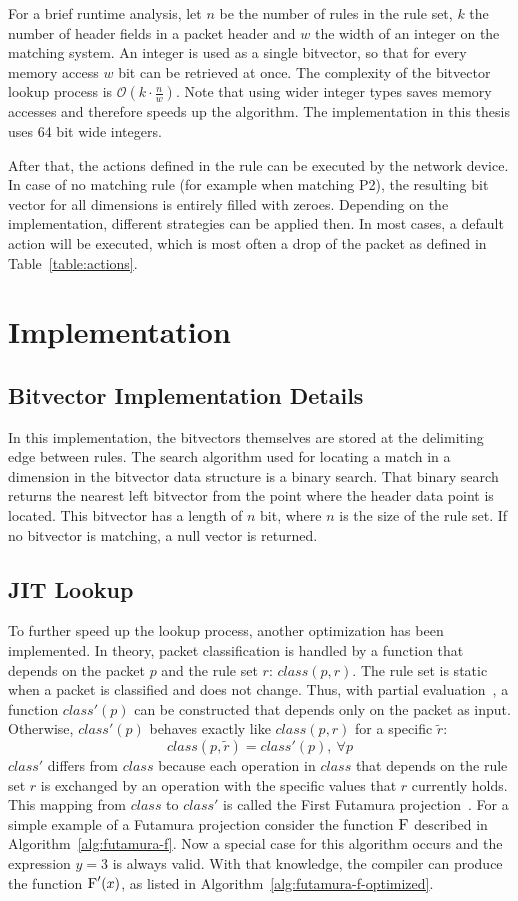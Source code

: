 \documentclass[a4paper,
		12pt,
		parskip=full,
		titlepage
		]{scrartcl}
\begin{document}
For a brief runtime analysis, let $n$ be the number of rules in the rule set, 
$k$ the number of header fields in a packet header and $w$ the width of an integer on the matching system.
An integer is used as a single bitvector, so that for every memory access $w$ bit can be retrieved at once.
The complexity of the bitvector lookup process is $\mathcal O(k \cdot \frac{n}{w})$.
Note that using wider integer types saves memory accesses and therefore speeds up the algorithm.
The implementation in this thesis uses 64 bit wide integers.

After that, the actions defined in the rule can be executed by the network device.
In case of no matching rule (for example when matching P2), the resulting bit vector for all dimensions is entirely filled with zeroes.
Depending on the implementation, different strategies can be applied then.
In most cases, a default action will be executed, 
which is most often a drop of the packet as defined in Table~\ref{table:actions}.

\section{Implementation}
\subsection{Bitvector Implementation Details}
In this implementation, the bitvectors themselves are stored at the delimiting edge
between rules.
The search algorithm used for locating a match in a dimension in the bitvector 
data structure is a binary search.
That binary search returns the nearest left bitvector from the point where 
the header data point is located.
This bitvector has a length of $n$ bit, where $n$ is the size of the rule set.
If no bitvector is matching, a null vector is returned.

\subsection{JIT Lookup}
To further speed up the lookup process, another optimization has been implemented.
In theory, packet classification is handled by a function that depends on the packet $p$ and the rule set $r$: $class(p, r)$.
The rule set is static when a packet is classified and does not change.
Thus, with partial evaluation~\cite{partial_eval}, a function $class'(p)$ can be constructed that depends only on the packet as input.
Otherwise, $class'(p)$ behaves exactly like $class(p, r)$ for a specific $\tilde{r}$:
$$class(p, \tilde{r}) = class'(p),\ \forall p$$
$class'$ differs from $class$ because each operation in $class$ that depends on the 
rule set $r$ is exchanged by an operation with the specific values that $r$ currently holds.
This mapping from $class$ to $class'$ is called the First Futamura projection~\cite{DBLP:journals/ngc/MogensenH88}.
For a simple example of a Futamura projection consider the function $\textsc{F}$ described in Algorithm~\ref{alg:futamura-f}.
Now a special case for this algorithm occurs and the expression $y = 3$ is always valid.
With that knowledge, the compiler can produce the function $\textsc{F}'(x)$, as listed in Algorithm~\ref{alg:futamura-f-optimized}.
\end{document}
